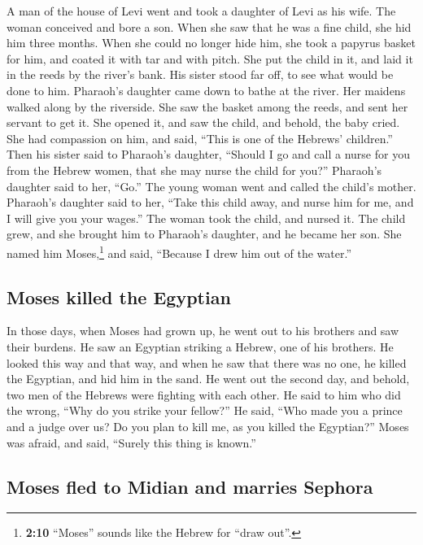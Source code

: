  A man of the house of Levi went and took a daughter of
Levi as his wife.  The woman conceived and bore a son.
When she saw that he was a fine child, she hid him three months.
 When she could no longer hide him, she took a papyrus
basket for him, and coated it with tar and with pitch. She put the child
in it, and laid it in the reeds by the river's bank.  His
sister stood far off, to see what would be done to him. 
Pharaoh's daughter came down to bathe at the river. Her maidens walked
along by the riverside. She saw the basket among the reeds, and sent her
servant to get it.  She opened it, and saw the child, and
behold, the baby cried. She had compassion on him, and said, ``This is
one of the Hebrews' children.''  Then his sister said to
Pharaoh's daughter, ``Should I go and call a nurse for you from the
Hebrew women, that she may nurse the child for you?'' 
Pharaoh's daughter said to her, ``Go.'' The young woman went and called
the child's mother.  Pharaoh's daughter said to her,
``Take this child away, and nurse him for me, and I will give you your
wages.'' The woman took the child, and nursed it.  The
child grew, and she brought him to Pharaoh's daughter, and he became her
son. She named him Moses,\footnote{\textbf{2:10} ``Moses'' sounds like
  the Hebrew for ``draw out''.} and said, ``Because I drew him out of
the water.''

\hypertarget{moses-killed-the-egyptian}{%
\subsection{Moses killed the Egyptian}\label{moses-killed-the-egyptian}}

 In those days, when Moses had grown up, he went out to
his brothers and saw their burdens. He saw an Egyptian striking a
Hebrew, one of his brothers.  He looked this way and that
way, and when he saw that there was no one, he killed the Egyptian, and
hid him in the sand.  He went out the second day, and
behold, two men of the Hebrews were fighting with each other. He said to
him who did the wrong, ``Why do you strike your fellow?''
 He said, ``Who made you a prince and a judge over us? Do
you plan to kill me, as you killed the Egyptian?'' Moses was afraid, and
said, ``Surely this thing is known.''

\hypertarget{moses-fled-to-midian-and-marries-sephora}{%
\subsection{Moses fled to Midian and marries
Sephora}\label{moses-fled-to-midian-and-marries-sephora}}

